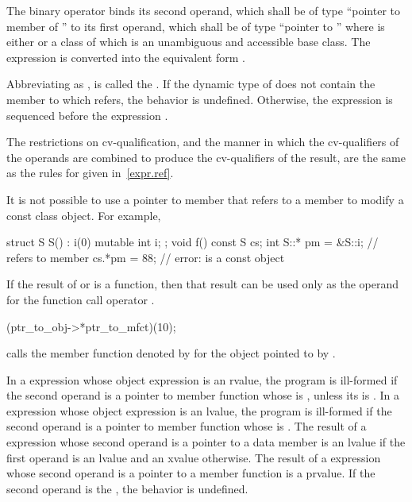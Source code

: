 \pnum
The binary operator \tcode{->*} binds its second operand, which shall be
of type ``pointer to member of '' to its first operand, which shall be of
type ``pointer to ''
where  is either  or
a class of which 
is an unambiguous and accessible base class.
The expression  is converted into the equivalent form
.

\pnum
Abbreviating  as , 
is called the .
If the dynamic type of  does not
contain the member to which
 refers, the behavior is undefined.
Otherwise, the expression  is sequenced before the expression .

\pnum
The restrictions on cv-qualification, and the manner in which
the cv-qualifiers of the operands are combined to produce the
cv-qualifiers of the result, are the same as the rules for
 given in~\ref{expr.ref}.
\begin{note}
It is not possible to use a pointer to member that refers to a
 member to modify a const class object. For
example,
\begin{codeblock}
struct S {
  S() : i(0) { }
  mutable int i;
};
void f()
{
const S cs;
int S::* pm = &S::i;            //  refers to  member 
cs.*pm = 88;                    // error:  is a const object
}
\end{codeblock}
\end{note}

\pnum
{}%
If the result of  or \tcode{->*} is a function, then that
result can be used only as the operand for the function call operator
\tcode{()}.
\begin{example}
\begin{codeblock}
(ptr_to_obj->*ptr_to_mfct)(10);
\end{codeblock}
calls the member function denoted by  for the object
pointed to by .
\end{example}
In a  expression whose object expression is an rvalue, the program is
ill-formed if the second operand is a pointer to member function
whose  is \tcode{\&},
unless its  is .
In a 
expression whose object expression is an lvalue, the program is ill-formed if the second
operand is
a pointer to member function
whose  is \tcode{\&\&}.
The result of a  expression
whose second operand is a pointer to a data member is an lvalue if the first
operand is an lvalue and an xvalue otherwise. The result of a  expression whose
second operand is a pointer to a member function is a prvalue.
If the second operand is the ,
the behavior is undefined.

